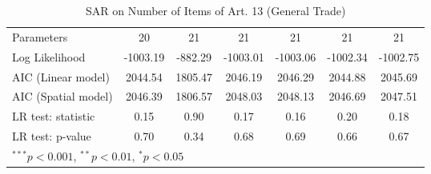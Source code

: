 \begin{table}[!h]
\begin{center}
\begin{tabular}{l c c c c c c }
Parameters              & 20           & 21           & 21           & 21           & 21           & 21           \\
Log Likelihood          & -1003.19     & -882.29      & -1003.01     & -1003.06     & -1002.34     & -1002.75     \\
AIC (Linear model)      & 2044.54      & 1805.47      & 2046.19      & 2046.29      & 2044.88      & 2045.69      \\
AIC (Spatial model)     & 2046.39      & 1806.57      & 2048.03      & 2048.13      & 2046.69      & 2047.51      \\
LR test: statistic      & 0.15         & 0.90         & 0.17         & 0.16         & 0.20         & 0.18         \\
LR test: p-value        & 0.70         & 0.34         & 0.68         & 0.69         & 0.66         & 0.67         \\
\bottomrule
\multicolumn{7}{l}{\scriptsize{$^{***}p<0.001$, $^{**}p<0.01$, $^*p<0.05$}}
\end{tabular}
\caption{SAR on Number of Items of Art. 13 (General Trade)}
\label{table:coefficients}
\end{center}
\end{table}
